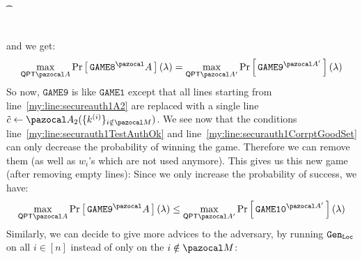 \begin{proofE}
\begin{pcimage}
{{        \t {}\\
        \hcancel[red]{\pcendfor}\setcounter{pclinenumber}{11}\\
      }}
  \end{pcimage}
  and we get:
  \begin{align}
    \max_{\QPT{} \cA} \pr{\texttt{GAME8}^\cA}(\lambda) = \max_{\QPT{} \cA'} \pr{\texttt{GAME9}^{\cA'}}(\lambda)
  \end{align}
  So now, $\texttt{GAME9}$ is like $\texttt{GAME1}$ except that all lines starting from line~\ref{my:line:secureauth1A2} are replaced with a single line $\tilde{c} \gets \cA_2(\{k^{(i)}\}_{i \notin \cM})$. We see now that the conditions line~\ref{my:line:securauth1TestAuthOk} and line~\ref{my:line:securauth1CorrptGoodSet} can only decrease the probability of winning the game. Therefore we can remove them (as well as $w_i$'s which are not used anymore). This gives us this new game (after removing empty lines):
  {\normalfont{}}
  Since we only increase the probability of success, we have:
  \begin{align}
    \max_{\QPT{} \cA} \pr{\texttt{GAME9}^\cA}(\lambda) \leq \max_{\QPT{} \cA'} \pr{\texttt{GAME10}^{\cA'}}(\lambda)
  \end{align}
  Similarly, we can decide to give more advices to the adversary, by running $ {\tt Gen}_{\tt Loc}$ on all $i \in [n]$ instead of only on the $i \notin \cM$:
  \begin{pcimage}
    {\normalfont{}}
\end{pcimage}
\end{proofE}
